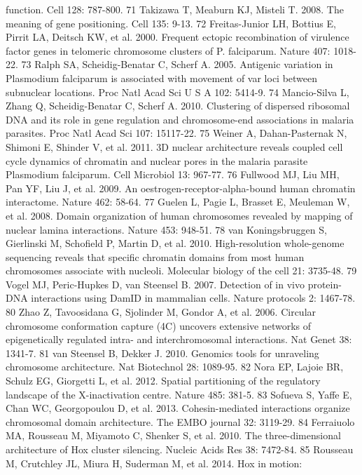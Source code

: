 function. Cell 128: 787-800.
71  Takizawa T, Meaburn KJ, Misteli T. 2008. The meaning of gene positioning.
Cell 135: 9-13.
72  Freitas-Junior LH, Bottius E, Pirrit LA, Deitsch KW, et al. 2000. Frequent
ectopic recombination of virulence factor genes in telomeric chromosome
clusters of P. falciparum. Nature 407: 1018-22.
73  Ralph SA, Scheidig-Benatar C, Scherf A. 2005. Antigenic variation in
Plasmodium falciparum is associated with movement of var loci between
subnuclear locations. Proc Natl Acad Sci U S A 102: 5414-9.
74  Mancio-Silva L, Zhang Q, Scheidig-Benatar C, Scherf A. 2010. Clustering of
dispersed ribosomal DNA and its role in gene regulation and chromosome-end
associations in malaria parasites. Proc Natl Acad Sci 107: 15117-22.
75  Weiner A, Dahan-Pasternak N, Shimoni E, Shinder V, et al. 2011. 3D nuclear
architecture reveals coupled cell cycle dynamics of chromatin and nuclear
pores in the malaria parasite Plasmodium falciparum. Cell Microbiol 13:
967-77.
76  Fullwood MJ, Liu MH, Pan YF, Liu J, et al. 2009. An
oestrogen-receptor-alpha-bound human chromatin interactome. Nature 462: 58-64.
77  Guelen L, Pagie L, Brasset E, Meuleman W, et al. 2008. Domain organization
of human chromosomes revealed by mapping of nuclear lamina interactions.
Nature 453: 948-51.
78  van Koningsbruggen S, Gierlinski M, Schofield P, Martin D, et al. 2010.
High-resolution whole-genome sequencing reveals that specific chromatin
domains from most human chromosomes associate with nucleoli. Molecular biology
of the cell 21: 3735-48.
79  Vogel MJ, Peric-Hupkes D, van Steensel B. 2007. Detection of in vivo
protein-DNA interactions using DamID in mammalian cells. Nature protocols 2:
1467-78.
80  Zhao Z, Tavoosidana G, Sjolinder M, Gondor A, et al. 2006. Circular
chromosome conformation capture (4C) uncovers extensive networks of
epigenetically regulated intra- and interchromosomal interactions. Nat Genet
38: 1341-7.
81  van Steensel B, Dekker J. 2010. Genomics tools for unraveling chromosome
architecture. Nat Biotechnol 28: 1089-95.
82  Nora EP, Lajoie BR, Schulz EG, Giorgetti L, et al. 2012. Spatial
partitioning of the regulatory landscape of the X-inactivation centre. Nature
485: 381-5.
83  Sofueva S, Yaffe E, Chan WC, Georgopoulou D, et al. 2013. Cohesin-mediated
interactions organize chromosomal domain architecture. The EMBO journal 32:
3119-29.
84  Ferraiuolo MA, Rousseau M, Miyamoto C, Shenker S, et al. 2010. The
three-dimensional architecture of Hox cluster silencing. Nucleic Acids Res 38:
7472-84.
85  Rousseau M, Crutchley JL, Miura H, Suderman M, et al. 2014. Hox in motion:
